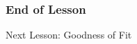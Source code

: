 \documentclass[xcolor=dvipsnames]{beamer}
\begin{document}


\begin{frame}
  \frametitle{End of Lesson}
Next Lesson: Goodness of Fit
\end{frame}
\end{document}
